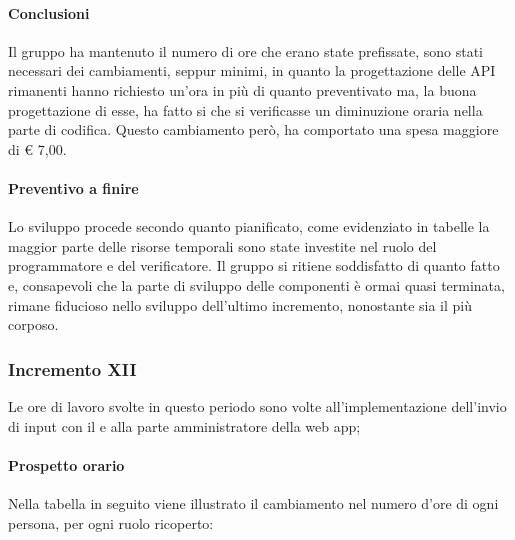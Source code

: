 		\paragraph{Conclusioni}
		Il gruppo ha mantenuto il numero di ore che erano state prefissate, sono stati necessari dei cambiamenti, seppur minimi, in quanto la progettazione delle API rimanenti hanno richiesto un'ora in più di quanto preventivato ma, la buona progettazione di esse, ha fatto si che si verificasse un diminuzione oraria nella parte di codifica. Questo cambiamento però, ha comportato una spesa maggiore di € 7,00.
		
		\paragraph{Preventivo a finire}
		Lo sviluppo procede secondo quanto pianificato, come evidenziato in tabelle la maggior parte delle risorse temporali sono state investite nel ruolo del programmatore e del verificatore. Il gruppo si ritiene soddisfatto di quanto fatto e, consapevoli che la parte di sviluppo delle componenti è ormai quasi terminata, rimane fiducioso nello sviluppo dell'ultimo incremento, nonostante sia il più corposo.
				
		
		\subsubsection{Incremento XII}
		Le ore di lavoro svolte in questo periodo sono volte all'implementazione dell'invio di input con il  e alla parte amministratore della web app;
		\paragraph{Prospetto orario}
		Nella tabella in seguito viene illustrato il cambiamento nel numero d'ore di ogni persona, per ogni ruolo ricoperto:
		
